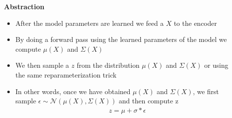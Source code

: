 \begin{frame}
	\begin{columns}
		\begin{overlayarea}{\textwidth}{\textheight}
		\vspace{1cm}
		
		\end{overlayarea}
		\begin{overlayarea}{\textwidth}{\textheight}
			\textbf{Abstraction}
			\begin{itemize}[<+->]\justifying
				\item After the model parameters are learned we feed a $X$ to the encoder
				\item By doing a forward pass using the learned parameters of the model we compute $\mu(X)$ and $\Sigma(X)$
				\item We then sample a $z$ from the distribution $\mu(X)$ and $\Sigma(X)$ or using the same reparameterization trick
				\item In other words, once we have obtained $\mu(X)$ and $\Sigma(X)$, we first sample $\epsilon \sim \mathcal{N}(\mu(X), \Sigma(X))$ and then compute z 
				\begin{align*}
				z = \mu + \sigma * \epsilon
				\end{align*}
			\end{itemize}
		\end{overlayarea}
	\end{columns}
\end{frame}

